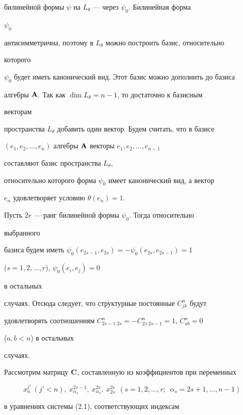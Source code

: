 билинейной формы $\psi$ на $L_\theta$ --- через $\psi_0$. Билинейная форма 


$\psi_0$  


антисимметрична, поэтому в $L_\theta$ можно построить базис, относительно 


которого 


$\psi_0$ будет иметь канонический вид. Этот базис можно дополнить до базиса  


алгебры $\bold A$. Так как $\dim L_\theta=n-1$, то достаточно к базисным 


векторам  


пространства $L_\theta$ добавить один вектор. Будем считать, что в базисе  


$(e_1,e_2,\dotsc,e_n)$ алгебры $\bold A$ векторы $e_1,e_2,\dotsc,e_{n-1}$ 


составляют базис пространства $L_\theta$, 


относительно которого форма $\psi_0$ имеет канонический вид, а вектор  


$e_n$ удовлетворяет условию $\theta(e_n)=1$. 


 


Пусть $2r$ --- ранг билинейной формы $\psi_0$. Тогда относительно 


выбранного  


базиса будем иметь $\psi_0(e_{2s-1},e_{2s})=-\psi_0(e_{2s},e_{2s-1})=1$ 


($s=1,2,\dotsc,r$), $\psi_0(e_i,e_j)=0$ 


в остальных  


случаях. Отсюда следует, что структурные постоянные $C^n_{jk}$ будут  


удовлетворять соотношениям $C^n_{2s-1\;2s}=-C^n_{2s\;2s-1}=1$, $C^n_{ab}=0$ 


($a,b<n$) в остальных  


случаях. 


 


Рассмотрим матрицу $\bold C$, составленную из коэффициентов при переменных 


$$ 


x^{j'}_n \ (j'<n), \ x^{2s-1}_{\alpha_s}, 


\ x^{2s}_{\alpha_s}, \ x^{2s}_{2s}\ \  


(s=1,2,\dotsc,r;\ \; \alpha_s=2s+1,\dotsc,n-1) 


$$ 


в уравнениях системы (2.1), соответствующих индексам 


